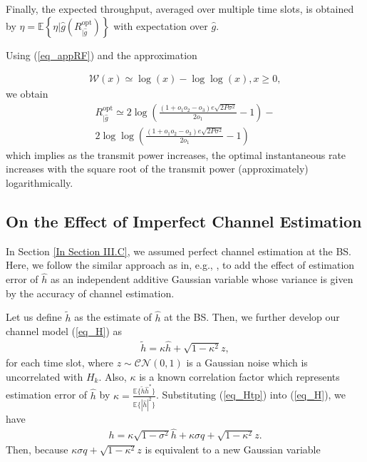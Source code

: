 Finally, the expected throughput, averaged over multiple time slots, is obtained by $\eta = \mathbb{E}\left\{\eta|{\hat {g}}(R_{|\hat{g}}^{\text{opt}})\right\}$ with expectation over $\hat g$.  

Using (\ref{eq_appRF}) and the approximation \cite[Them. 2.1]{hoorfar2007approximation}

\begin{align}
    \mathcal{W}(x) \simeq \log(x)-\log\log(x), x\geq0,
\end{align}
we obtain
\begin{align}
    R_{|\hat{g}}^{\text{opt}}\simeq 2\log\left(\frac{(1+o_1o_2-o_3)e\sqrt{2P\sigma^2}}{2o_1}-1\right)-\nonumber\\
    2\log\log\left(\frac{(1+o_1o_2-o_3)e\sqrt{2P\sigma^2}}{2o_1}-1\right)
\end{align}
which implies as the transmit power increases, the optimal instantaneous rate increases with the square root of the transmit power (approximately) logarithmically.

\subsection{On the Effect of Imperfect Channel Estimation}
In Section \ref{In Section III.C}, we assumed perfect channel estimation at the BS. Here, we follow the similar approach as in, e.g., \cite{Wang2007TWCperformance}, to add the effect of estimation error of $\hat{h}$ as an independent additive Gaussian variable whose variance is given by the accuracy of channel estimation. 

Let us define $\tilde h$ as the estimate of $\hat h$ at the BS. Then,  we further develop our channel model  (\ref{eq_H}) as
\begin{align}\label{eq_Htp}
    \tilde{h} = \kappa \hat{h} + \sqrt{1-\kappa^2} z, 
\end{align}
for each time slot, where $z \sim \mathcal{CN}(0,1)$ is a Gaussian noise which is uncorrelated with $H_{k}$. Also, $\kappa$ is a known correlation factor which represents estimation error of $\hat{h}$ by $\kappa = \frac{\mathbb{E}\{\tilde{h}\hat{h}^*\}}{\mathbb{E}\{|\hat{h}|^2\}}$. Substituting (\ref{eq_Htp}) into (\ref{eq_H}), we have
\begin{align}\label{eq_Ht}
    h = \kappa\sqrt{1-\sigma^2}\hat{h}+\kappa\sigma q+\sqrt{1-\kappa^2}z.
\end{align}
Then, because  $\kappa\sigma q + \sqrt{1-\kappa^2}z$ is equivalent to a new Gaussian variable 

